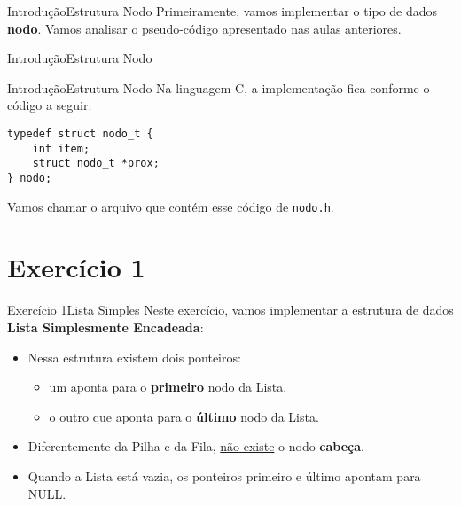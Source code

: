 \documentclass[aspectratio=169]{beamer}
\begin{document}

\begin{frame}[fragile]{Introdução}{Estrutura Nodo}
Primeiramente, vamos implementar o tipo de dados {\bf nodo}. Vamos analisar o pseudo-código apresentado nas aulas anteriores.
\end{frame}



\begin{frame}[fragile]{Introdução}{Estrutura Nodo}
\begin{algorithm}[H]
\caption{Nodo} 
\label{Nodo}
\end{algorithm} 
\end{frame}


\begin{frame}[fragile]{Introdução}{Estrutura Nodo}
Na linguagem C, a implementação fica conforme o código a seguir:
\begin{lstlisting}[style=CStyle]
typedef struct nodo_t {
    int item;
    struct nodo_t *prox; 
} nodo;
\end{lstlisting}   
Vamos chamar o arquivo que contém esse código de \verb|nodo.h|.
\end{frame}


\section{Exercício 1}

\begin{frame}{Exercício 1}{Lista Simples}
Neste exercício, vamos implementar a estrutura de dados {\bf Lista Simplesmente Encadeada}:
\begin{itemize}
 \item Nessa estrutura existem dois ponteiros:
 \begin{itemize}
    \item um aponta para o {\bf primeiro} nodo da Lista.
    \item o outro que aponta para o {\bf último} nodo da Lista.
 \end{itemize}
 \item Diferentemente da Pilha e da Fila, \underline{não existe} o nodo {\bf cabeça}.
 \item Quando a Lista está vazia, os ponteiros primeiro e último apontam para NULL.
\end{itemize}
\end{frame}
\end{document}
